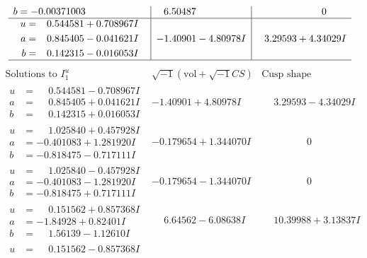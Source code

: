 \documentclass[1p]{elsarticle_modified}
\theoremstyle{definition}
\newcommand{\I}{\sqrt{-1}}
\begin{document}
$$\begin{array}{c|c|c}
\begin{aligned}
b &= -0.00371003\phantom{ +0.000000I}\end{aligned}
 & \phantom{-}6.50487\phantom{ +0.000000I} & \phantom{-0.000000 } 0 \\ \hline\begin{aligned}
u &= \phantom{-}0.544581 + 0.708967 I \\
a &= \phantom{-}0.845405 - 0.041621 I \\
b &= \phantom{-}0.142315 - 0.016053 I\end{aligned}
 & -1.40901 - 4.80978 I & \phantom{-}3.29593 + 4.34029 I\\
 \hline 
 \end{array}$$\newpage$$\begin{array}{c|c|c}  
\text{Solutions to }I^u_{1}& \I (\text{vol} + \sqrt{-1}CS) & \text{Cusp shape}\\
 \hline 
\begin{aligned}
u &= \phantom{-}0.544581 - 0.708967 I \\
a &= \phantom{-}0.845405 + 0.041621 I \\
b &= \phantom{-}0.142315 + 0.016053 I\end{aligned}
 & -1.40901 + 4.80978 I & \phantom{-}3.29593 - 4.34029 I \\ \hline\begin{aligned}
u &= \phantom{-}1.025840 + 0.457928 I \\
a &= -0.401083 + 1.281920 I \\
b &= -0.818475 - 0.717111 I\end{aligned}
 & -0.179654 + 1.344070 I & \phantom{-0.000000 } 0 \\ \hline\begin{aligned}
u &= \phantom{-}1.025840 - 0.457928 I \\
a &= -0.401083 - 1.281920 I \\
b &= -0.818475 + 0.717111 I\end{aligned}
 & -0.179654 - 1.344070 I & \phantom{-0.000000 } 0 \\ \hline\begin{aligned}
u &= \phantom{-}0.151562 + 0.857368 I \\
a &= -1.84928 + 0.82401 I \\
b &= \phantom{-}1.56139 - 1.12610 I\end{aligned}
 & \phantom{-}6.64562 - 6.08638 I & \phantom{-}10.39988 + 3.13837 I \\ \hline\begin{aligned}
u &= \phantom{-}0.151562 - 0.857368 I \\

\end{aligned}
\end{array}$$
\end{document}
